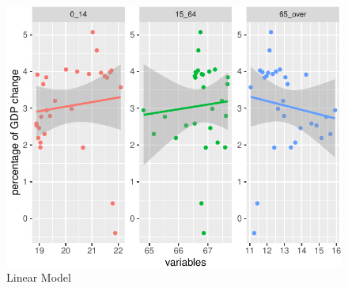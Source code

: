 \documentclass[11pt,a4paper,]{article}
\begin{document}
\begin{figure}[H]

{\centering \includegraphics{Figures/lm1-1} 

}

\caption{Linear Model}\label{fig:lm1}
\end{figure}

\providecommand{\docline}[3]{\noalign{\global\setlength{\arrayrulewidth}{#1}}\arrayrulecolor[HTML]{#2}\cline{#3}}

\setlength{\tabcolsep}{2pt}

\renewcommand*{\arraystretch}{1.5}
\end{document}
